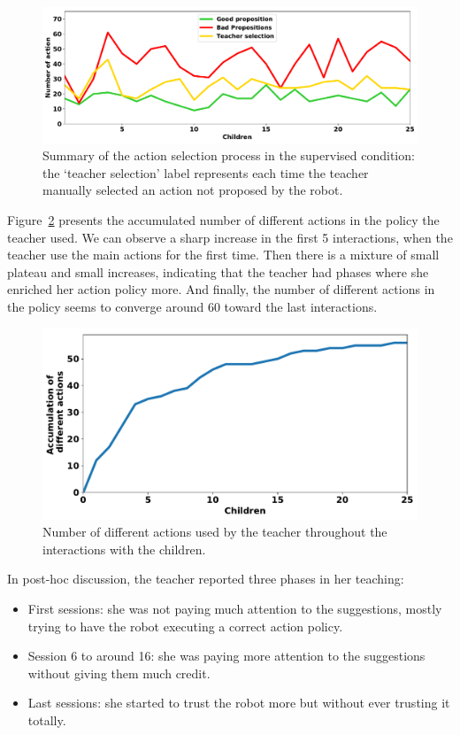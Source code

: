 \begin{figure}[ht]
	\includegraphics[width=1\linewidth]{./summary_supervision.pdf}
	\centering
	\caption{Summary of the action selection process in the supervised condition: the `teacher selection' label represents each time the teacher manually selected an action not proposed by the robot.}
	\label{fig:tutoring_supervision}
\end{figure}


Figure~\ref{fig:tutoring_actions} presents the accumulated number of different actions in the policy the teacher used. We can observe a sharp increase in the first 5 interactions, when the teacher use the main actions for the first time. Then there is a mixture of small plateau and small increases, indicating that the teacher had phases where she enriched her action policy more. And finally, the number of different actions in the policy seems to converge around 60 toward the last interactions.

\begin{figure}[ht]
	\includegraphics[width=.85\linewidth]{./number_actions.pdf}
	\centering
	\caption{Number of different actions used by the teacher throughout the interactions with the children.}
	\label{fig:tutoring_actions}
\end{figure}


In post-hoc discussion, the teacher reported three phases in her teaching: 
\begin{itemize}
	\item First sessions: she was not paying much attention to the suggestions, mostly trying to have the robot executing a correct action policy.
	\item Session 6 to around 16: she was paying more attention to the suggestions without giving them much credit.
	\item Last sessions: she started to trust the robot more but without ever trusting it totally.
\end{itemize}


